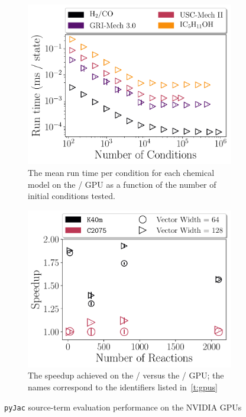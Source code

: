 \documentclass[12pt,number,sort&compress,preprint]{elsarticle}
\begin{document}
\begin{figure}[htbp]
   \centering
  \begin{subfigure}[t]{0.48\linewidth}
      \includegraphics[width=\textwidth]{gpu_source_scaling.pdf}
      \caption{The mean run time per condition for each chemical model on the \gpunew/ GPU as a function of the number of initial conditions tested.}
      \label{F:gpu_source_scaling}
  \end{subfigure}
  \hfill
  \begin{subfigure}[t]{0.48\linewidth}
      \includegraphics[width=\textwidth]{gpu_source_speedup.pdf}
      \caption{The speedup achieved on the \gpunew/ versus the \gpuold/ GPU; the names correspond to the identifiers listed in~\cref{t:gpus}}
      \label{F:gpu_source_speedup}
  \end{subfigure}
  \caption{\texttt{pyJac} source-term evaluation performance on the NVIDIA GPUs}
  \label{F:gpu_source}
\end{figure}
\end{document}

